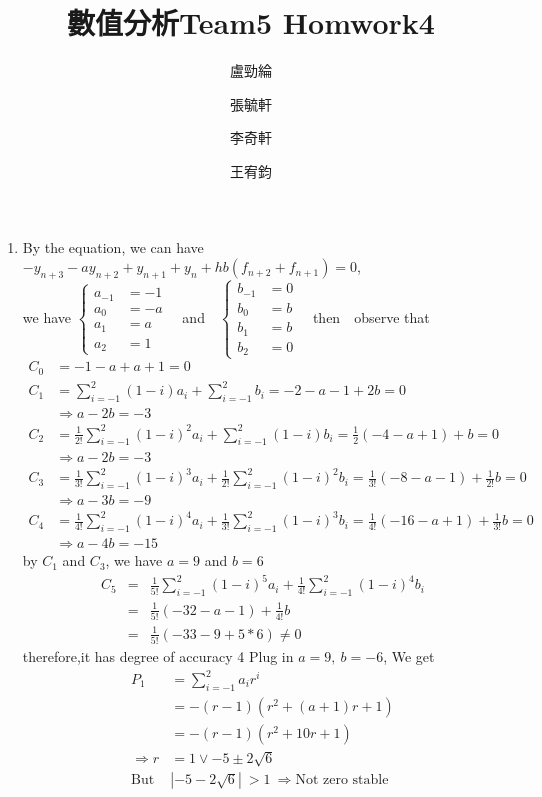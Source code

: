 \documentclass[12pt]{article}
\title{數值分析Team5 Homwork4}
\author{盧勁綸\and 張毓軒\and 李奇軒\and 王宥鈞}
\date{}
\begin{document}
\maketitle
\begin{enumerate}
    \item %
        By the equation, we can have $-y_{n+3}-ay_{n+2}+y_{n+1}+y_{n}+hb(f_{n+2}+f_{n+1})=0$, \\ we have $\begin{cases} a_{-1} &=-1 \\ a_0&=-a \\ a_1&=a \\ a_2&=1 \end{cases}$\ \ and\ \ $\begin{cases} b_{-1} &=0 \\ b_0&=b \\ b_1&=b \\ b_2&=0 \end{cases}$\ \ then\ \ observe that
        \begin{align*}
        C_0 &= -1-a+a+1 = 0 \\
        C_1 &= \sum_{i=-1}^2(1-i)a_i+\sum_{i=-1}^2b_i = -2-a-1+2b = 0 \\
        &\Rightarrow a-2b = -3 \\
        C_2 &= \frac{1}{2!}\sum_{i=-1}^2(1-i)^2a_i+\sum_{i=-1}^2(1-i)b_i = \frac{1}{2}(-4-a+1)+b = 0 \\
        &\Rightarrow a-2b = -3\\
        C_3 &= \frac{1}{3!}\sum_{i=-1}^2(1-i)^3a_i+\frac{1}{2!}\sum_{i=-1}^2(1-i)^2b_i = \frac{1}{3!}(-8-a-1)+\frac{1}{2!}b = 0 \\
        &\Rightarrow a-3b = -9 \\
        C_4 &= \frac{1}{4!}\sum_{i=-1}^2(1-i)^4a_i+\frac{1}{3!}\sum_{i=-1}^2(1-i)^3b_i = \frac{1}{4!}(-16-a+1)+\frac{1}{3!}b = 0 \\
        &\Rightarrow a-4b = -15
        \end{align*}
        by $C_1$ and $C_3$, we have $a=9$ and $b=6$ 
        \begin{eqnarray*}
        C_5 &=& \frac{1}{5!}\sum_{i=-1}^{2}(1-i)^5a_i+\frac{1}{4!}\sum_{i=-1}^2(1-i)^4b_i\\
            &=& \frac{1}{5!}(-32-a-1)+\frac{1}{4!}b\\
            &=& \frac{1}{5!}(-33-9+5*6)\neq 0
            \end{eqnarray*}
            therefore,it has degree of accuracy 4
            Plug in $a=9,~b=-6$, We get
            \begin{align*}
            P_1&=\sum_{i=-1}^2a_ir^i \\
            &=-(r-1)(r^2+(a+1)r+1)\\
            &=-(r-1)(r^2+10r+1) \\
            \Rightarrow r&= 1 \vee -5 \pm 2\sqrt{6} \\
            \text{But } &|-5-2\sqrt{6}|~>1	~\Rightarrow \text{Not zero stable}
            \end{align*}
        

\end{enumerate}
\end{document}
